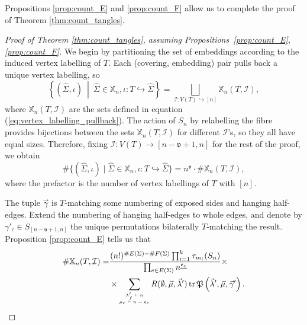 \documentclass{amsart}
\newcommand{\covers}{\mathbb{X}_n}
\newcommand{\tr}{\operatorname{tr}}
\newcommand{\whS}{{\widehat{\Sigma}}}
\begin{document}
Propositions \ref{prop:count_E} and \ref{prop:count_F} allow us to complete the proof of Theorem \ref{thm:count_tangles}.
\begin{proof}[Proof of Theorem \ref{thm:count_tangles}, assuming Propositions~\ref{prop:count_E},\ref{prop:count_F}]
We begin by partitioning the set of embeddings according to the induced vertex labelling of $T$. Each (covering, embedding) pair pulls back a unique vertex labelling, so
\begin{equation*}
\left\{(\whS,\iota)\ \middle|\ \whS\in\covers,\iota\colon T\hookrightarrow\whS\right\}=\bigsqcup_{\mathcal{I}\colon V(T)\hookrightarrow[n]}\covers(T,\mathcal{I}),
\end{equation*}
where $\covers(T,\mathcal{I})$ are the sets defined in equation (\ref{eq:vertex_labelling_pullback}). The action of $S_n$ by relabelling the fibre provides bijections between the sets $\covers(T,\mathcal{I})$ for different $\mathcal{I}$'s, so they all have equal sizes. Therefore, fixing $\mathcal{I}\colon V(T)\to[n-\mathfrak{v}+1,n]$ for the rest of the proof, we obtain
\begin{equation}\label{eq:summation_labellings}
\#\{(\whS,\iota)\mid\whS\in\covers,\iota\colon T\hookrightarrow\whS\}=n^{\underline{\mathfrak{v}}}\cdot\#\covers(T,\mathcal{I}),
\end{equation}
where the prefactor is the number of vertex labellings of $T$ with $[n]$.

The tuple $\vec\gamma$ is $T$-matching some numbering of exposed sides and hanging half-edges. Extend the numbering of hanging half-edges to whole edges, and denote by $\gamma'_c\in S_{[n-\mathfrak{v}+1,n]}$ the unique permutations bilaterally $T$-matching the result. Proposition \ref{prop:count_E} tells us that
\begin{align}\begin{split}\label{eq:labelled_embs}
\#\covers(T,\mathcal{I})=&\frac{(n!)^{\#E(\Sigma)-\#F(\Sigma)}\prod_{i=1}^k\tau_{m_i}(S_n)}{\prod_{e\in E(\Sigma)}n^{\underline{\mathfrak{e}_e}}}\times\\
&\times\sum_{\tiny\begin{matrix}\lambda'_f\vdash n\\\mu_e\vdash n-\mathfrak{e}_e\end{matrix}}R(\emptyset,\vec\mu,\vec\lambda')\tr\mathfrak{P}\left(\vec\lambda',\vec\mu,\vec\gamma'\right).
\end{split}\end{align}


\end{proof}
\end{document}
